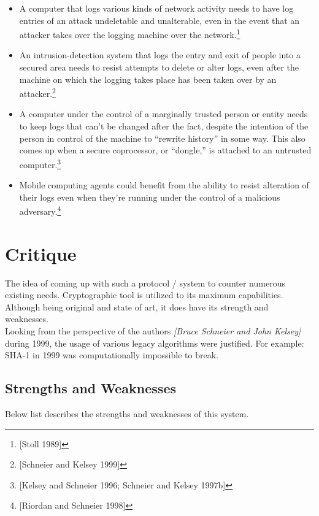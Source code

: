 \documentclass[12pt, letter]{article}
\newcommand\paperAuthors[2]{[#1 and #2]}
\newcommand\makePaperAuthors{\paperAuthors{Bruce Schneier}{John Kelsey}}
\begin{document}
\begin{itemize}
    \item A computer that logs various kinds of network activity needs to have log entries of an attack undeletable and unalterable, even in the event that an attacker takes over the logging machine over the network.\footnote{[Stoll 1989]}
    
    \item An intrusion-detection system that logs the entry and exit of people into a secured area needs to resist attempts to delete or alter logs, even after the machine on which the logging takes place has been taken over by an attacker.\footnote{[Schneier and Kelsey 1999]}

    \item A computer under the control of a marginally trusted person or entity needs to keep logs that can’t be changed after the fact, despite the intention of the person in control of the machine to “rewrite history” in some way. This also comes up when a secure coprocessor, or “dongle,” is attached to an untrusted computer.\footnote{[Kelsey and Schneier 1996; Schneier and Kelsey 1997b]}

    \item Mobile computing agents could benefit from the ability to resist alteration of their logs even when they’re running under the control of a malicious adversary.\footnote{[Riordan and Schneier 1998]}
\end{itemize}


\section{Critique}

The idea of coming up with such a protocol / system to counter numerous existing needs. Cryptographic tool is utilized to its maximum capabilities. Although being original and state of art, it does have its strength and weaknesses.\\

Looking from the perspective of the authors \textit{\makePaperAuthors} during 1999, the usage of various legacy algorithms were justified. For example: SHA-1 in 1999 was computationally impossible to break.

\subsection{Strengths and Weaknesses}

Below list describes the strengths and weaknesses of this system.
\end{document}
